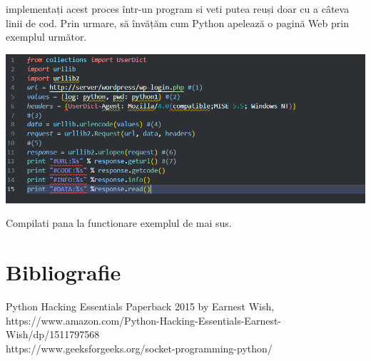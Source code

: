 \documentclass[oneside,20pt]{article}          %
\begin{document}
implementați acest proces într-un program si veti putea reuși doar cu a
câteva linii de cod. Prin urmare, să învățăm cum Python apelează o pagină Web
prin exemplul următor.
\begin{center}
\includegraphics[height = 5 cm]{9.png}
\end{center}
Compilati pana la functionare exemplul de mai sus.
\section{Bibliografie}
Python Hacking Essentials Paperback 2015 by Earnest Wish, \\
https://www.amazon.com/Python-Hacking-Essentials-Earnest-Wish/dp/1511797568\\
https://www.geeksforgeeks.org/socket-programming-python/
\end{document}
